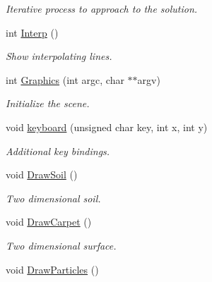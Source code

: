 \begin{DoxyCompactItemize}
\begin{DoxyCompactList}\small\item\em \-Iterative process to approach to the solution. \end{DoxyCompactList}\item 
\hypertarget{classForces_ae411df3ab40a4d3b604548c9afa0a8f4}{int \hyperlink{classForces_ae411df3ab40a4d3b604548c9afa0a8f4}{\-Interp} ()}\label{classForces_ae411df3ab40a4d3b604548c9afa0a8f4}

\begin{DoxyCompactList}\small\item\em \-Show interpolating lines. \end{DoxyCompactList}\item 
\hypertarget{classForces_a7411c318f14258f65a45ba2572697aa2}{int \hyperlink{classForces_a7411c318f14258f65a45ba2572697aa2}{\-Graphics} (int argc, char $\ast$$\ast$argv)}\label{classForces_a7411c318f14258f65a45ba2572697aa2}

\begin{DoxyCompactList}\small\item\em \-Initialize the scene. \end{DoxyCompactList}\item 
\hypertarget{classForces_aef7ba2f69afb2d954545f64c7fe24b14}{void \hyperlink{classForces_aef7ba2f69afb2d954545f64c7fe24b14}{keyboard} (unsigned char key, int x, int y)}\label{classForces_aef7ba2f69afb2d954545f64c7fe24b14}

\begin{DoxyCompactList}\small\item\em \-Additional key bindings. \end{DoxyCompactList}\item 
\hypertarget{classForces_a67bc3c9dc5545a69fc67ac97ad8073d7}{void \hyperlink{classForces_a67bc3c9dc5545a69fc67ac97ad8073d7}{\-Draw\-Soil} ()}\label{classForces_a67bc3c9dc5545a69fc67ac97ad8073d7}

\begin{DoxyCompactList}\small\item\em \-Two dimensional soil. \end{DoxyCompactList}\item 
\hypertarget{classForces_a513ff446a4f7dcabe0879c5225686bb5}{void \hyperlink{classForces_a513ff446a4f7dcabe0879c5225686bb5}{\-Draw\-Carpet} ()}\label{classForces_a513ff446a4f7dcabe0879c5225686bb5}

\begin{DoxyCompactList}\small\item\em \-Two dimensional surface. \end{DoxyCompactList}\item 
\hypertarget{classForces_a2e34d3fde75270ca8e234e988acacaeb}{void \hyperlink{classForces_a2e34d3fde75270ca8e234e988acacaeb}{\-Draw\-Particles} ()}\label{classForces_a2e34d3fde75270ca8e234e988acacaeb}


\end{DoxyCompactItemize}
